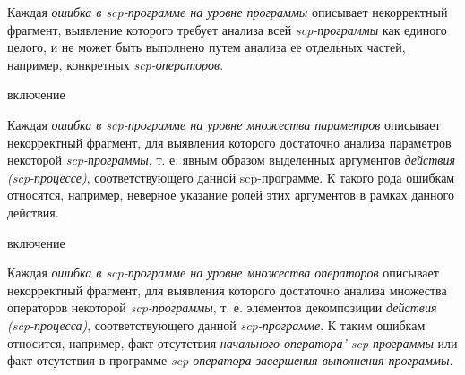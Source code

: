 Каждая \textit{ошибка в scp-программе на уровне программы} описывает некорректный фрагмент, выявление которого требует анализа всей \textit{scp-программы} как единого целого, и не может быть выполнено путем анализа ее отдельных частей, например, конкретных \textit{scp-операторов}.

\begin{SCn}
\begin{scnrelfromlist}{включение}
    \begin{scnindent}
    \end{scnindent}
    \begin{scnindent}
    \end{scnindent}
\end{scnrelfromlist}
\end{SCn}

Каждая \textit{ошибка в scp-программе на уровне множества параметров} описывает некорректный фрагмент, для выявления которого достаточно анализа параметров некоторой \textit{scp-программы}, т. е. явным образом выделенных аргументов \textit{действия (scp-процессе)}, соответствующего данной scp-программе. К такого рода ошибкам относятся, например, неверное указание ролей этих аргументов в рамках данного действия.

\begin{SCn}
\begin{scnrelfromlist}{включение}
    \begin{scnindent}
    \end{scnindent}
    \begin{scnindent}
    \end{scnindent}
\end{scnrelfromlist}
\end{SCn}

Каждая \textit{ошибка в scp-программе на уровне множества операторов} описывает некорректный фрагмент, для выявления которого достаточно анализа множества операторов некоторой \textit{scp-программы}, т. е. элементов декомпозиции \textit{действия (scp-процесса)}, соответствующего данной \textit{scp-программе}. К таким ошибкам относится, например, факт отсутствия \textit{начального оператора' scp-программы} или факт отсутствия в программе \textit{scp-оператора завершения выполнения программы}.

